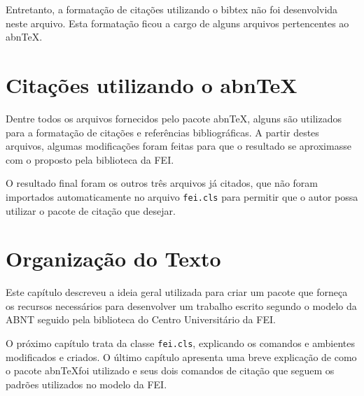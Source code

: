 Entretanto, a formatação de citações utilizando o bibtex não foi desenvolvida neste arquivo. Esta formatação ficou a cargo de alguns arquivos pertencentes ao abn\TeX.

\section{Citações utilizando o abn\TeX}

Dentre todos os arquivos fornecidos pelo pacote abn\TeX, alguns são utilizados para a formatação de citações e referências bibliográficas. A partir destes arquivos, algumas modificações foram feitas para que o resultado se aproximasse com o proposto pela biblioteca da FEI.

O resultado final foram os outros três arquivos já citados, que não foram importados automaticamente no arquivo \texttt{fei.cls} para permitir que o autor possa utilizar o pacote de citação que desejar.

\section{Organização do Texto}

Este capítulo descreveu a ideia geral utilizada para criar um pacote que forneça os recursos necessários para desenvolver um trabalho escrito segundo o modelo da ABNT seguido pela biblioteca do Centro Universitário da FEI.

O próximo capítulo trata da classe \texttt{fei.cls}, explicando os comandos e ambientes modificados e criados. O último capítulo apresenta uma breve explicação de como o pacote abn\TeX foi utilizado e seus dois comandos de citação que seguem os padrões utilizados no modelo da FEI.

